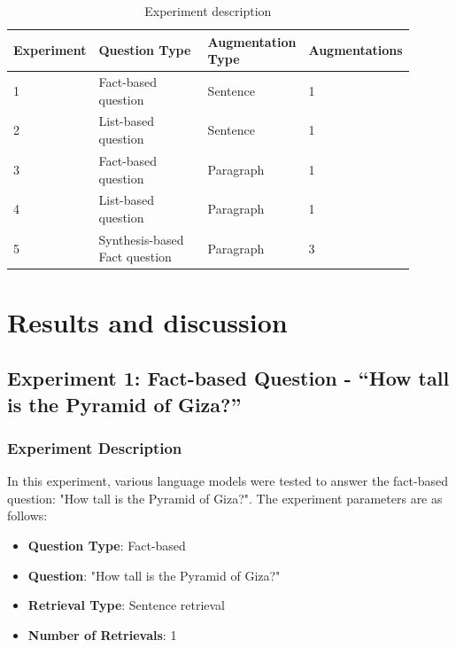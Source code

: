 \documentclass{wseas}
\begin{document}
\begin{table}[htbp]
  \caption{Experiment description} 
  \label{tab:experiment_questions_table}
    \centering
      \begin{tabular} {|p{0.15\linewidth}|p{0.35\linewidth}|p{0.25\linewidth}|p{0.15\linewidth}|}
        \hline
        \textbf{Experiment} & \textbf{Question Type} & \textbf{Augmentation Type} & \textbf{Augmentations} \\ \hline
        1 & Fact-based question & Sentence & 1 \\ \hline
        2 & List-based question & Sentence & 1 \\ \hline
        3 & Fact-based question & Paragraph & 1 \\ \hline
        4 & List-based question & Paragraph & 1 \\ \hline
        5 & Synthesis-based Fact question & Paragraph & 3 \\ \hline
      \end{tabular}
\end{table}

    

\section{Results and discussion}

\subsection{Experiment 1: Fact-based Question - ``How tall is the
Pyramid of
Giza?''}

\subsubsection{Experiment Description}
In this experiment, various language models were tested to answer the
fact-based question: "How tall is the Pyramid of Giza?". The
experiment parameters are as follows:

\begin{itemize}
\item
  \textbf{Question Type}: Fact-based
\item
  \textbf{Question}: "How tall is the Pyramid of Giza?"
\item
  \textbf{Retrieval Type}: Sentence retrieval
\item
  \textbf{Number of Retrievals}: 1
\end{itemize}
\end{document}
